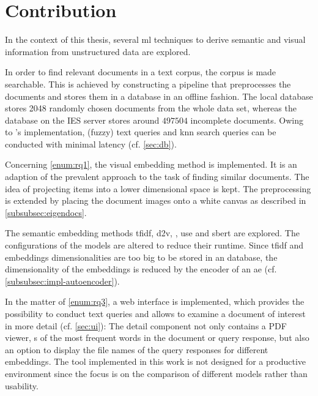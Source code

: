 \section{Contribution}\label{sec:contribution}

In the context of this thesis, several \ac{ml} techniques to derive semantic and visual information 
from unstructured data are explored.

In order to find relevant documents in a text corpus, the corpus is made searchable.
This is achieved by constructing a pipeline that preprocesses the documents 
and stores them in a database in an offline fashion.
The local \databaseName{} database stores 2048 randomly chosen documents from the whole data set, 
whereas the database on the IES server stores around $497504$ incomplete documents.
Owing to \databaseName{}'s implementation, (fuzzy) text queries and \ac{knn} search queries 
can be conducted with minimal latency (cf. \autoref{sec:db}).

Concerning \ref{enum:rq1}, the visual embedding method \eigendocs{} is implemented.
It is an adaption of the prevalent \eigenfaces{} approach to the task of finding similar documents.
The idea of projecting items into a lower dimensional space is kept.
The preprocessing is extended by placing the document images onto a white canvas 
as described in \autoref{subsubsec:eigendocs}.

The semantic embedding methods \ac{tfidf}, \ac{d2v}, \infersent{}, \ac{use} and \ac{sbert} are explored.
The configurations of the models are altered to reduce their runtime.
Since \ac{tfidf} and \infersent{} embeddings dimensionalities are too big 
to be stored in an \databaseName{} database, 
the dimensionality of the embeddings is reduced by the encoder of an \ac{ae} 
(cf. \autoref{subsubsec:impl-autoencoder}).
 
In the matter of \ref{enum:rq3}, a web interface is implemented, 
which provides the possibility to conduct text queries and
allows to examine a document of interest in more detail (cf. \autoref{sec:ui}):
The detail component not only contains a PDF viewer, 
\wordcloud{}s of the most frequent words in the document or query response, 
but also an option to display the file names of the query responses for different embeddings.
The tool implemented in this work is not designed for a productive environment since 
the focus is on the comparison of different models rather than usability.

